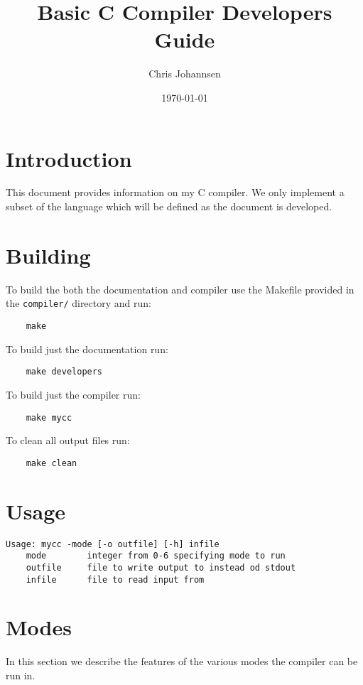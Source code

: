 \documentclass{article}
\title{Basic C Compiler Developers Guide}
\author{Chris Johannsen}
\date{\today}
\begin{document}
\maketitle

\section{Introduction}

This document provides information on my C compiler. We only implement a subset of the language which will be defined as the document is developed.

\section{Building}

To build the both the documentation and compiler use the Makefile provided in the \verb|compiler/| directory and run:

\begin{verbatim}
    make
\end{verbatim}

\noindent To build just the documentation run:

\begin{verbatim}
    make developers
\end{verbatim}

\noindent To build just the compiler run:

\begin{verbatim}
    make mycc
\end{verbatim}

\noindent To clean all output files run:

\begin{verbatim}
    make clean
\end{verbatim}

\section{Usage}

\begin{verbatim}
Usage: mycc -mode [-o outfile] [-h] infile
    mode        integer from 0-6 specifying mode to run
    outfile     file to write output to instead od stdout
    infile      file to read input from
\end{verbatim}

\section{Modes}

In this section we describe the features of the various modes the compiler can be run in.








\end{document}
